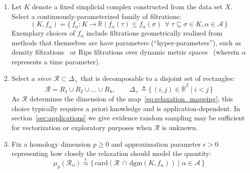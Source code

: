 \documentclass[10pt]{article}
\numberwithin{equation}{section}
\newcommand{\+}{%
	\raisebox{0.18ex}{\scaleobj{0.55}{+}}
}
\theoremstyle{definition}
\theoremstyle{definition}
\begin{document}
\begin{enumerate}
	\item Let $K$ denote a fixed simplicial complex constructed from the data set $X$. Select a continuously-parameterized family of filtrations:
	$$(K, f_\alpha) = \{ \, f_\alpha : K \to \mathbb{R} \mid f_\alpha(\tau) \leq f_\alpha(\sigma) \;\, \forall \; \tau \subseteq \sigma \in K, \alpha \in \mathcal{A} \, \}$$
	Exemplary choices of $f_\alpha$ include filtrations geometrically realized from methods that themselves are have parameters (``hyper-parameters''), such as density filtrations~\cite{} or Rips filtrations over dynamic metric spaces~\cite{} (wherein $\alpha$ represents a time parameter).  
	\item Select a \emph{sieve} $\mathcal{R} \subset \Delta_+$ that is decomposable to a disjoint set of rectangles:
	$$ \mathcal{R} = R_1 \cup R_2 \cup \dots \cup R_h,  \quad \quad \Delta_+ \triangleq \{ \, (i,j) \in \bar{\mathbb{R}}^2  \mid i < j \, \}$$ 
	As $\mathcal{R}$ determines the dimension of the map~\eqref{eq:relaxation_mapping}, this choice typically requires a priori knowledge and is application-dependent. In section~\ref{sec:applications} we give evidence random sampling may be sufficient for vectorization or exploratory purposes when $\mathcal{R}$ is unknown.

	
	\item Fix a homology dimension $p\geq 0$ and approximation parameter $\epsilon > 0$ representing how closely the relaxation should model the quantity: 
	\begin{equation}\label{eq:mu_alpha}
		\mu_p(\mathcal{R}_\alpha) \stackrel{\epsilon}{\approx} \{ \, \mathrm{card}(\mathcal{R} \, \cap \, \mathrm{dgm}(K, f_\alpha)) \mid \alpha \in \mathcal{A} \, \}
	\end{equation}


\end{enumerate}
\end{document}
